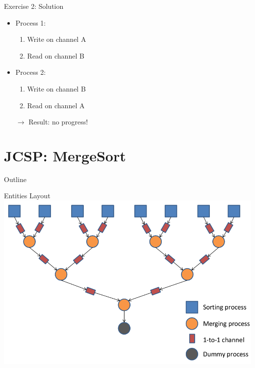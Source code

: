 \begin{frame}{Exercise 2: Solution}
  \begin{itemize}
  \item Process 1:
    \begin{enumerate}
    \item Write on channel A
    \item Read on channel B
    \end{enumerate}
  \item Process 2:
    \begin{enumerate}
    \item Write on channel B
    \item Read on channel A
    \end{enumerate}
  \item[$\rightarrow$] Result: no progress!
  \end{itemize}
\end{frame}


\section{JCSP: MergeSort}

\begin{frame}{Outline}
  \tableofcontents[current]
\end{frame}

\begin{frame}{Entities Layout}
  \includegraphics[width=\textwidth]{figures/mergesort}
\end{frame}

